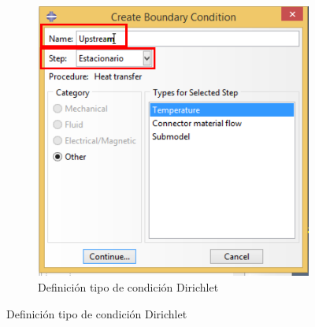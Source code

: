 \begin{figure}
\begin{subfigure}[!h]{0.45\textwidth}
      \includegraphics[width=\textwidth]{./body/images/load03.pdf}
      \caption{Definición tipo de condición Dirichlet}
      \label{load03}
    \end{subfigure}%


\end{figure}
